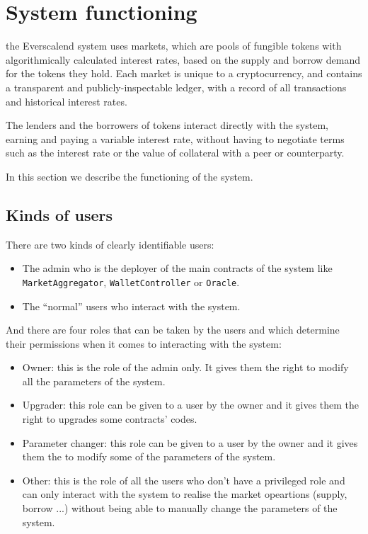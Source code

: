 \section{System functioning}

the Everscalend system uses markets, which are pools of fungible tokens with algorithmically calculated interest rates, based on the supply and borrow demand for the tokens they hold. Each market is unique to a cryptocurrency, and contains a transparent and publicly-inspectable ledger, with a record of all transactions and historical interest rates.

The lenders and the borrowers of tokens interact directly with the system, earning and paying a variable interest rate, without having to negotiate terms such as the interest rate or the value of collateral with a peer or counterparty.

In this section we describe the functioning of the system.

\subsection{Kinds of users}

There are two kinds of clearly identifiable users:
\begin{itemize}
  \item The admin who is the deployer of the main contracts of the system like \verb|MarketAggregator|, \verb|WalletController| or \verb|Oracle|.
  \item The ``normal'' users who interact with the system.
\end{itemize}
And there are four roles that can be taken by the users and which determine their permissions when it comes to interacting with the system:
\begin{itemize}
  \item Owner: this is the role of the admin only. It gives them the right to modify all the parameters of the system.
  \item Upgrader: this role can be given to a user by the owner and it gives them the right to upgrades some contracts' codes.
  \item Parameter changer: this role can be given to a user by the owner and it gives them the to modify some of the parameters of the system.
  \item Other: this is the role of all the users who don't have a privileged role and can only interact with the system to realise the market opeartions (supply, borrow ...) without being able to manually change the parameters of the system.
\end{itemize}

